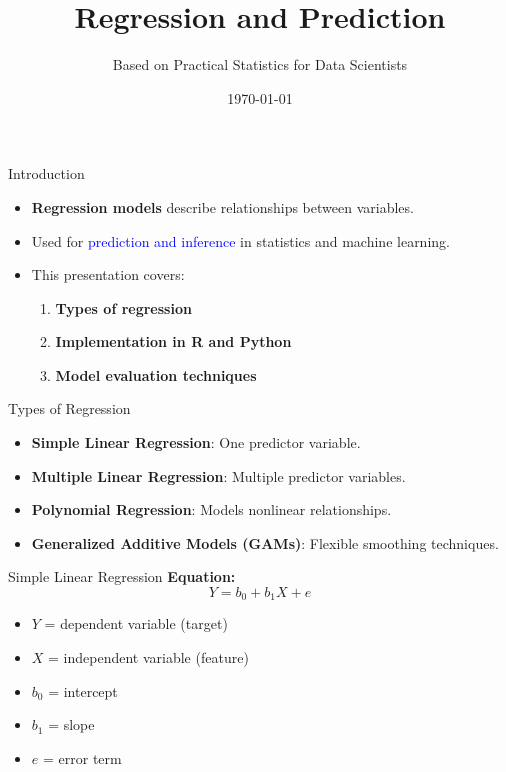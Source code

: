 \documentclass{beamer}
\title{Regression and Prediction}
\author{Based on Practical Statistics for Data Scientists}
\date{\today}
\begin{document}
\begin{frame}
    \titlepage
\end{frame}

\begin{frame}{Introduction}
    \begin{itemize}
        \item \textbf{Regression models} describe relationships between variables.
        \item Used for \textcolor{blue}{prediction and inference} in statistics and machine learning.
        \item This presentation covers:
        \begin{enumerate}
            \item \textbf{Types of regression}
            \item \textbf{Implementation in R and Python}
            \item \textbf{Model evaluation techniques}
        \end{enumerate}
    \end{itemize}
\end{frame}

\begin{frame}{Types of Regression}
    \begin{itemize}
        \item \textbf{Simple Linear Regression}: One predictor variable.
        \item \textbf{Multiple Linear Regression}: Multiple predictor variables.
        \item \textbf{Polynomial Regression}: Models nonlinear relationships.
        \item \textbf{Generalized Additive Models (GAMs)}: Flexible smoothing techniques.
    \end{itemize}
\end{frame}

\begin{frame}{Simple Linear Regression}
    \textbf{Equation:}
    \[
    Y = b_0 + b_1X + e
    \]
    \begin{itemize}
        \item \( Y \) = dependent variable (target)
        \item \( X \) = independent variable (feature)
        \item \( b_0 \) = intercept
        \item \( b_1 \) = slope
        \item \( e \) = error term
    \end{itemize}
\end{frame}
\end{document}
